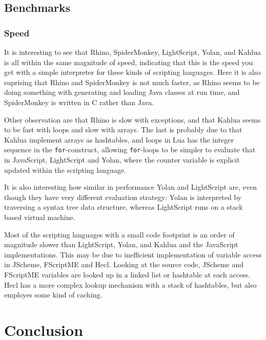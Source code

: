 \documentclass[11pt]{report}
\begin{document}
\section{Benchmarks}
\subsection{Speed}

It is interesting to see that Rhino, SpiderMonkey, LightScript, Yolan, and Kahlua is all within the same magnitude of speed, indicating that this is the speed you get with a simple interpreter for these kinds of scripting languages. Here it is also suprising that Rhino and SpiderMonkey is not much faster, as Rhino seems to be doing something with generating and loading Java classes at run time, and SpiderMonkey is written in C rather than Java.

Other observation are that Rhino is slow with exceptions, and that Kahlua seems to be fast with loops and slow with arrays. The last is probably due to that Kahlua implement arrays as hashtables, and loops in Lua has the integer sequence in the \verb|for|-construct, allowing \verb|for|-loops to be simpler to evaluate that in JavaScript, LightScript and Yolan, where the counter variable is explicit updated within the scripting language.

It is also interesting how similar in performance Yolan and LightScript are, even though they have very different evaluation strategy: Yolan is interpreted by traversing a syntax tree data structure, whereas LightScript runs on a stack based virtual machine. 

Most of the scripting languages with a small code footprint is an order of magnitude slower than LightScript, Yolan, and Kahlua and the JavaScript implementations.
This may be due to inefficient implementation of variable access in JScheme, FScriptME and Hecl. Looking at the source code, JScheme and FScriptME variables are looked up in a linked list or hashtable at each access. Hecl has a more complex lookup mechanism with a stack of hashtables, but also employes some kind of caching.



\chapter{Conclusion}
\label{conclusion}


%
%
\end{document}
